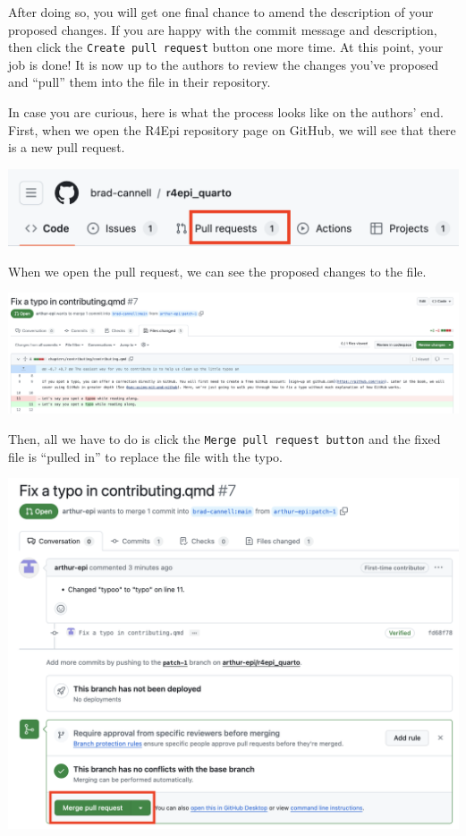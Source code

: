 \documentclass[
  letterpaper,
  DIV=11,
  numbers=noendperiod]{scrreprt}
\begin{document}
After doing so, you will get one final chance to amend the description
of your proposed changes. If you are happy with the commit message and
description, then click the \texttt{Create\ pull\ request} button one
more time. At this point, your job is done! It is now up to the authors
to review the changes you've proposed and ``pull'' them into the file in
their repository.

In case you are curious, here is what the process looks like on the
authors' end. First, when we open the R4Epi repository page on GitHub,
we will see that there is a new pull request.

\includegraphics{chapters/contributing/create_pull_request_3.png}

When we open the pull request, we can see the proposed changes to the
file.

\includegraphics{chapters/contributing/create_pull_request_4.png}

Then, all we have to do is click the
\texttt{Merge\ pull\ request\ button} and the fixed file is ``pulled
in'' to replace the file with the typo.

\includegraphics{chapters/contributing/create_pull_request_5.png}
\end{document}
